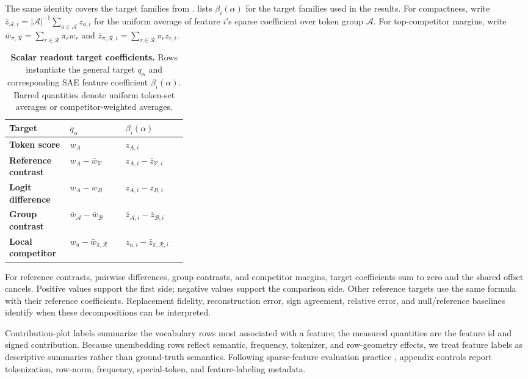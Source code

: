 The same identity covers the target families from .
 lists \(\beta_i(\alpha)\) for the target
families used in the results.
For compactness, write
\(\bar{z}_{\mathcal{A},i}=|\mathcal{A}|^{-1}\sum_{a\in\mathcal{A}}z_{a,i}\)
for the uniform average of feature \(i\)'s sparse coefficient over token group
\(\mathcal{A}\). For top-competitor margins, write
\(\bar{w}_{\pi,\mathcal{R}}=\sum_{r\in\mathcal{R}}\pi_r w_r\) and
\(\bar{z}_{\pi,\mathcal{R},i}=\sum_{r\in\mathcal{R}}\pi_r z_{r,i}\).

\begin{table}[tbp]
\caption{\textbf{Scalar readout target coefficients.}
Rows instantiate the general target \(q_\alpha\) and corresponding SAE feature
coefficient \(\beta_i(\alpha)\). Barred quantities denote uniform token-set
averages or competitor-weighted averages.}
\label{tab:method-special-cases}
\centering
\footnotesize
\setlength{\tabcolsep}{3pt}
\renewcommand{\arraystretch}{1.14}
\begin{tabularx}{\linewidth}{@{}>{\RaggedRight\arraybackslash}p{0.34\linewidth}Z Z@{}}
\toprule
Target & \(q_\alpha\) & \(\beta_i(\alpha)\) \\
\midrule
\textbf{Token score} & \(w_A\) & \(z_{A,i}\) \\
\addlinespace[1pt]
\textbf{Reference contrast} & \(w_A-\bar{w}_{\mathcal{V}}\) &
\(z_{A,i}-\bar{z}_{\mathcal{V},i}\) \\
\addlinespace[1pt]
\textbf{Logit difference} & \(w_A-w_B\) & \(z_{A,i}-z_{B,i}\) \\
\addlinespace[1pt]
\textbf{Group contrast} &
\(\bar{w}_{\mathcal{A}}-\bar{w}_{\mathcal{B}}\) &
\(\bar{z}_{\mathcal{A},i}-\bar{z}_{\mathcal{B},i}\) \\
\addlinespace[1pt]
\textbf{Local competitor} &
\(w_u-\bar{w}_{\pi,\mathcal{R}}\) &
\(z_{u,i}-\bar{z}_{\pi,\mathcal{R},i}\) \\
\bottomrule
\end{tabularx}
\end{table}

For reference contrasts, pairwise differences, group contrasts, and competitor
margins, target coefficients sum to zero and the shared offset cancels. Positive
values support the first side; negative values support the comparison side.
Other reference targets use the same formula with their reference coefficients.
Replacement fidelity, reconstruction error, sign agreement, relative error, and
null/reference baselines identify when these decompositions can be interpreted.

Contribution-plot labels summarize the vocabulary rows most associated with a
feature; the measured quantities are the feature id and signed contribution.
Because unembedding rows reflect semantic, frequency, tokenizer, and row-geometry
effects, we treat feature labels as descriptive summaries rather than
ground-truth semantics. Following sparse-feature evaluation practice
\citep{karvonen2025saebench,makelov2024principled}, appendix controls report
tokenization, row-norm, frequency, special-token, and feature-labeling metadata.
